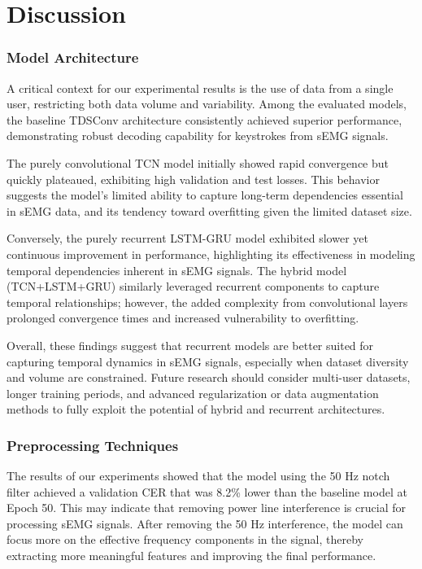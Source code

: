 \section{Discussion}

\subsubsection{Model Architecture}

A critical context for our experimental results is the use of data from a single user, restricting both data volume and variability. Among the evaluated models, the baseline TDSConv architecture consistently achieved superior performance, demonstrating robust decoding capability for keystrokes from sEMG signals.

The purely convolutional TCN model initially showed rapid convergence but quickly plateaued, exhibiting high validation and test losses. This behavior suggests the model’s limited ability to capture long-term dependencies essential in sEMG data, and its tendency toward overfitting given the limited dataset size.

Conversely, the purely recurrent LSTM-GRU model exhibited slower yet continuous improvement in performance, highlighting its effectiveness in modeling temporal dependencies inherent in sEMG signals. The hybrid model (TCN+LSTM+GRU) similarly leveraged recurrent components to capture temporal relationships; however, the added complexity from convolutional layers prolonged convergence times and increased vulnerability to overfitting.

Overall, these findings suggest that recurrent models are better suited for capturing temporal dynamics in sEMG signals, especially when dataset diversity and volume are constrained. Future research should consider multi-user datasets, longer training periods, and advanced regularization or data augmentation methods to fully exploit the potential of hybrid and recurrent architectures.

\subsubsection{Preprocessing Techniques}
The results of our experiments showed that the model using the 50 Hz notch filter achieved a validation CER that was 8.2\% lower than the baseline model at Epoch 50. This may indicate that removing power line interference is crucial for processing sEMG signals. After removing the 50 Hz interference, the model can focus more on the effective frequency components in the signal, thereby extracting more meaningful features and improving the final performance.

